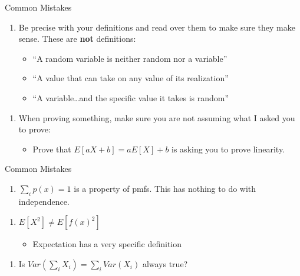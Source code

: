 \begin{frame}{Common Mistakes}

\begin{enumerate}[<+->]
\def\labelenumi{\arabic{enumi}.}
\setcounter{enumi}{2}
\tightlist
\item
  Be precise with your definitions and read over them to make sure they
  make sense. These are \textbf{not} definitions:

  \begin{itemize}[<+->]
  \tightlist
  \item
    ``A random variable is neither random nor a variable''
  \item
    ``A value that can take on any value of its realization''
  \item
    ``A variable\ldots{}and the specific value it takes is random''
  \end{itemize}
\end{enumerate}

\begin{enumerate}[<+->]
\def\labelenumi{\arabic{enumi}.}
\setcounter{enumi}{3}
\tightlist
\item
  When proving something, make sure you are not assuming what I asked
  you to prove:

  \begin{itemize}[<+->]
  \tightlist
  \item
    Prove that \(E[aX + b] = aE[X] + b\) is asking you to prove
    linearity.
  \end{itemize}
\end{enumerate}

\end{frame}

\begin{frame}{Common Mistakes}

\begin{enumerate}[<+->]
\def\labelenumi{\arabic{enumi}.}
\setcounter{enumi}{4}
\tightlist
\item
  \(\sum_i p(x) = 1\) is a property of pmfs. This has nothing to do with
  independence.
\end{enumerate}

\begin{enumerate}[<+->]
\def\labelenumi{\arabic{enumi}.}
\setcounter{enumi}{5}
\tightlist
\item
  \(E[X^2] \neq E[f(x)^2]\)

  \begin{itemize}[<+->]
  \tightlist
  \item
    Expectation has a very specific definition
  \end{itemize}
\end{enumerate}

\begin{enumerate}[<+->]
\def\labelenumi{\arabic{enumi}.}
\setcounter{enumi}{6}
\tightlist
\item
  Is \(Var(\sum_i X_i) = \sum_i Var(X_i)\) always true?
\end{enumerate}

\end{frame}

